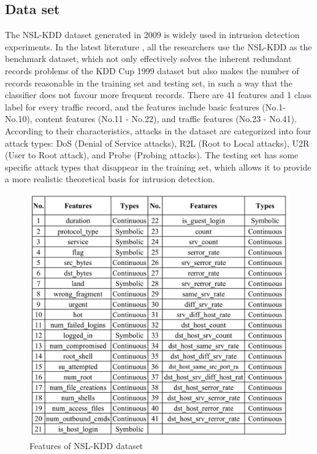 \subsection{Data set}
\vspace{-18pt}
The NSL-KDD dataset generated in 2009 is widely used in intrusion detection experiments. In the latest literature , all the researchers use the NSL-KDD as the benchmark dataset, which not only effectively solves
the inherent redundant records problems of the KDD Cup 1999 dataset but also makes the number of records reasonable in the training set and testing set, in such a way that the classifier does not favour more frequent records. There are 41 features and 1 class label for every traffic record, and the features include basic features (No.1- No.10), content features (No.11 - No.22), and traffic features (No.23 - No.41). According to their characteristics, attacks in the dataset are categorized into four attack types: DoS (Denial of Service attacks), R2L (Root to Local attacks), U2R (User to Root attack), and Probe (Probing attacks). The testing set has some specific attack types that disappear in the training set, which allows it to provide a more realistic theoretical basis for intrusion detection.
\begin{figure}[h] %
\begin{center}
	\includegraphics[width=5in]{images/ftr1.jpg} 
	\caption{Features of NSL-KDD dataset} %
	\label{} %
\end{center}
\end{figure}
